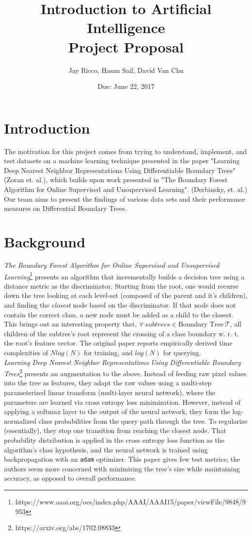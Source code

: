 \documentclass[10pt,letterpaper]{article}
\author{Jay Ricco, Hasan Saif, David Van Chu}
\title{Introduction to Artificial Intelligence\\Project Proposal}
\date{Due: June 22, 2017}
\begin{document}
	\maketitle
	\section{Introduction}
		The motivation for this project comes from trying to understand, implement, and test datasets on a machine learning technique presented in the paper "Learning Deep Nearest Neighbor Representations Using Differentiable Boundary Trees" (Zoran et. al.), which builds upon work presented in "The Boundary Forest Algorithm for Online Supervised and Unsupervised Learning". (Derbinsky, et. al.) Our team aims to present the findings of various data sets and their performance measures on Differential Boundary Trees.\\
	\section{Background}
		\textit{The Boundary Forest Algorithm for Online Supervised and Unsupervised Learning}\footnote{https://www.aaai.org/ocs/index.php/AAAI/AAAI15/paper/viewFile/9848/9953} presents an algorithm that incrementally builds a decision tree using a distance metric as the discriminator. Starting from the root, one would recurse down the tree looking at each level-set (composed of the parent and it's children), and finding the \textit{closest} node based on the discriminator. If that node does not contain the correct class, a new node must be added as a child to the closest. This brings out an interesting property that, $\forall\ subtrees \in \text{Boundary Tree}\ \mathcal{T}$, all children of the subtree's root represent the crossing of a class boundary w. r. t. the root's feature vector. The original paper reports empirically derived time complexities of $Nlog(N)$ for training, and $log(N)$ for querying. \\
		
		\textit{Learning Deep Nearest Neighbor Representations Using Differentiable Boundary Trees}\footnote{https://arxiv.org/abs/1702.08833} presents an augmentation to the above. Instead of feeding raw pixel values into the tree as features, they adapt the raw values using a multi-step parameterized linear transform (multi-layer neural network), where the parameters are learned via cross entropy loss minimization. However, instead of applying a softmax layer to the output of the neural network, they form the log-normalized class probabilities from the query path through the tree. To regularize (essentially), they stop one transition from reaching the closest node. That probability distribution is applied in the cross entropy loss function as the algorithm's class hypothesis, and the neural network is trained using backpropagation with an \texttt{adam} optimizer. This paper gives few test metrics; the authors seem more concerned with minimizing the tree's size while maintaining accuracy, as opposed to overall performance.\\
		
\end{document}
